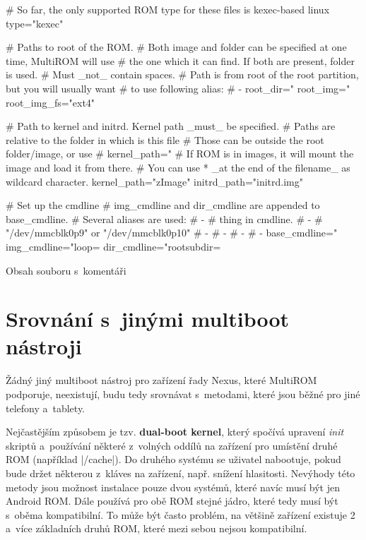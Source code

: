 \documentclass[12pt, a4paper, oneside]{article}
\newcommand{\B}{\textbf} %
\newcommand{\It}{\textit}  %
\begin{document}
\linespread{1.1}
\begin{listing}[H]
\begin{inicode}
# So far, the only supported ROM type for these files is kexec-based linux
type="kexec"

# Paths to root of the ROM.
# Both image and folder can be specified at one time, MultiROM will use 
# the one which it can find. If both are present, folder is used.
# Must _not_ contain spaces.
# Path is from root of the root partition, but you will usually want
# to use following alias:
# - %
root_dir="%
root_img="%
root_img_fs="ext4"

# Path to kernel and initrd. Kernel path _must_ be specified.
# Paths are relative to the folder in which is this file
# Those can be outside the root folder/image, or use %
# kernel_path="%
# If ROM is in images, it will mount the image and load it from there.
# You can use  * _at the end of the filename_ as wildcard character.
kernel_path="zImage"
initrd_path="initrd.img"

# Set up the cmdline
# img_cmdline and dir_cmdline are appended to base_cmdline.
# Several aliases are used:
#  - %
#         thing in cmdline.
#  - %
#         "/dev/mmcblk0p9" or "/dev/mmcblk0p10"
#  - %
#  - %
#  - %
#  - %
base_cmdline="%
img_cmdline="loop=%
dir_cmdline="rootsubdir=%
\end{inicode}
\caption{Obsah souboru  s~komentáři}
\label{rom-info}
\end{listing}

\linespread{1.3}

\section{Srovnání s~jinými multiboot nástroji}
Žádný jiný multiboot nástroj pro zařízení řady Nexus, které MultiROM podporuje, neexistují, budu tedy srovnávat s~metodami, které jsou běžné pro jiné telefony a~tablety.

Nejčastějším způsobem je tzv. \B{dual-boot kernel}, který spočívá upravení \It{init} skriptů a~používání některé z~volných oddílů na zařízení pro umístění druhé ROM (například |/cache|). Do druhého systému se uživatel nabootuje, pokud bude držet některou z~kláves na zařízení, např. snížení hlasitosti. Nevýhody této metody jsou možnost instalace pouze dvou systémů, které navíc musí být jen Android ROM. Dále používá pro obě ROM stejné jádro, které tedy musí být s~oběma kompatibilní. To může být často problém, na většině zařízení existuje 2 a~více základních druhů ROM, které mezi sebou nejsou kompatibilní.
\end{document}
